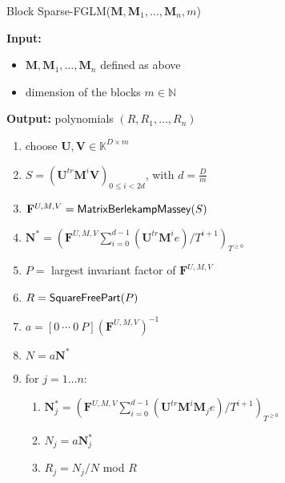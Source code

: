 \documentclass[12pt]{article}
\def\mF{\mathbf{F}}
\def\mM{\mathbf{M}}
\def\mN{\mathbf{N}}
\def\mU{\mathbf{U}}
\def\mV{\mathbf{V}}
\begin{document}
\begin{algorithm}[H]
	\caption{Block Sparse-FGLM($\mM,\mM_1,\dots,\mM_n,m$)}
	{\bf Input:} \vspace{-0.5em}
	\begin{itemize}
		\item $\mM,\mM_1,\dots,\mM_n$ defined as above
		\item dimension of the blocks $m \in \mathbb{N}$
	\end{itemize}
	{\bf Output:} polynomials $(R,R_1,\dots,R_n)$
  \begin{enumerate}[{\bf 1.}]
		\item {\sf choose $\mU,\mV \in \mathbb{K}^{D \times m}$}
		\item {\sf $S= (\mU^{tr}\mM^i\mV)_{0 \le i < 2d}$, with $d = \frac{D}{m}$}
		\item {\sf $\mF^{U,M,V} = {\sf MatrixBerlekampMassey}(S)$}
		\item {\sf $\mN^* = (\mF^{U,M,V}\sum_{i=0}^{d-1} {(\mU^{tr}\mM^ie)}/{T^{i+1}})_{T^{\ge 0}}$} 
		\item {\sf $P=$ largest invariant factor of $\mF^{U,M,V}$}
		\item {\sf $R={\sf SquareFreePart}(P)$} 
		\item {\sf $a = [0 ~\cdots~ 0 ~ P] (\mF^{U,M,V})^{-1}$}
		\item {\sf $N=a\mN^*$}
		\item {\sf for $j = 1 \dots n$:}
    \begin{enumerate}[{\bf 9.1.}]
			\item {\sf	$\mN_j^* = (\mF^{U,M,V}
				\sum_{i= 0}^{d-1} {(\mU^{tr}\mM^i \mM_j e)}/{T^{i+1}})_{T^{\ge0}}$}
			\item {\sf $N_j=a\mN_j^*$}
			\item {\sf $R_j=N_j/N$ mod $R$}
		\end{enumerate}
	\end{enumerate}
	\label{algo:block-sparse-fglm}
\end{algorithm}
\end{document}
